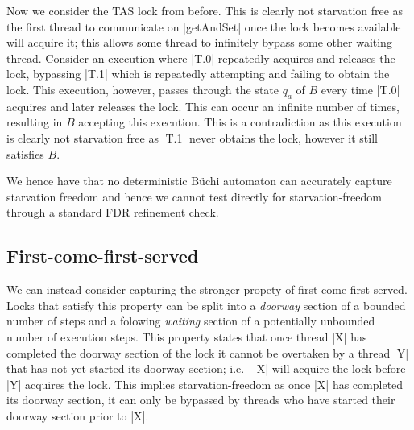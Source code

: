 
Now we consider the TAS lock from before. This is clearly not starvation free as the first thread to communicate on |getAndSet| once the lock becomes available will acquire it; this allows some thread to infinitely bypass some other waiting thread. Consider an execution where |T.0| repeatedly acquires and releases the lock, bypassing |T.1| which is repeatedly attempting and failing to obtain the lock. This execution, however, passes through the state $q_{a}$ of $B$ every time |T.0| acquires and later releases the lock. This can occur an infinite number of times, resulting in $B$ accepting this execution. This is a contradiction as this execution is clearly not starvation free as |T.1| never obtains the lock, however it still satisfies $B$.



We hence have that no deterministic B{\"u}chi automaton can accurately capture starvation freedom and hence we cannot test directly for starvation-freedom through a standard FDR refinement check.

\subsection{First-come-first-served}

We can instead consider capturing the stronger propety of first-come-first-served. Locks that satisfy this property can be split into a \emph{doorway} section of a bounded number of steps and a folowing \emph{waiting} section of a potentially unbounded number of execution steps. This property states that once thread |X| has completed the doorway section of the lock it cannot be overtaken by a thread |Y| that has not yet started its doorway section; i.e.~ |X| will acquire the lock before |Y| acquires the lock. This implies starvation-freedom as once |X| has completed its doorway section, it can only be bypassed by threads who have started their doorway section prior to |X|.

